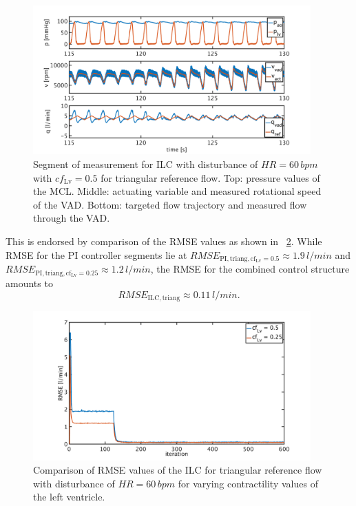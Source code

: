 \begin{figure}[ht!]
  \centering
  \includegraphics[width=0.95\textwidth]{images/chapt_5/ILC/pi_to_ilc_dist_triang_cf50.pdf}
  \caption[]{Segment of measurement for ILC with disturbance of $HR=60\,bpm$ with $cf_{\mathrm{Lv}}=0.5$ for triangular reference flow. Top:  pressure values of the MCL. Middle: actuating variable and measured rotational speed of the VAD. Bottom: targeted flow trajectory and measured flow through the VAD.}
  \label{fig:pi_to_ilc_dist_triang_cf50}
\end{figure}
\newpage
This is endorsed by comparison of the RMSE values as shown in \figurename~\ref{fig:RMSE_dist_triang_var_cf}. While RMSE for the PI controller segments lie at $RMSE_{\mathrm{PI,triang,cf_{\mathrm{Lv}}=0.5}}\approx 1.9\, l/min$ and $RMSE_{\mathrm{PI,triang,cf_{\mathrm{Lv}}=0.25}}\approx 1.2\, l/min$, the RMSE for the combined control structure amounts to
\begin{equation}
  RMSE_{\mathrm{ILC,triang}}\approx 0.11\, l/min.
\end{equation}
\begin{figure}[ht!]
  \centering
  \includegraphics[width=0.95\textwidth]{images/chapt_5/ILC/RMSE_dist_triang_var_cf.pdf}
  \caption[RMSE Comparison of ILC at triangular reference flow for varying left ventricular contractilities]{Comparison of RMSE values of the ILC for triangular reference flow with disturbance of $HR=60\,bpm$ for varying contractility values of the left ventricle.}
  \label{fig:RMSE_dist_triang_var_cf}
\end{figure}

